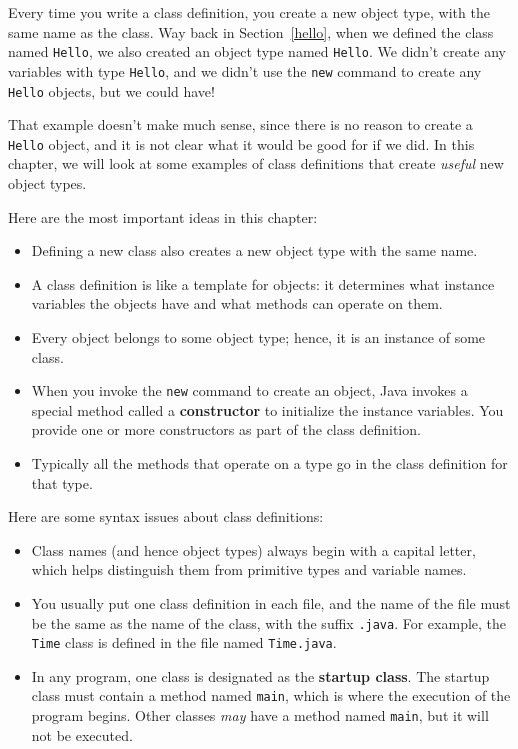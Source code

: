 \documentclass{book}
\begin{document}
Every time you write a class definition, you create a new
object type, with the same name as the class.  Way back in
Section~\ref{hello}, when we defined the class named {\tt Hello},
we also created an object type named {\tt Hello}.  We
didn't create any variables with type {\tt Hello}, and we
didn't use the {\tt new} command to create any {\tt Hello}
objects, but we could have!

That example doesn't make much sense, since there is no
reason to create a {\tt Hello} object, and it is not clear
what it would be good for if we did.  In this chapter, we
will look at some examples of class definitions that create
{\em useful} new object types.

Here are the most important ideas in this chapter:

\begin{itemize}

\item Defining a new class also creates a new object type
with the same name.

\item A class definition is like a template for objects:
it determines what instance variables the objects have and
what methods can operate on them.

\item Every object belongs to some object type; hence, it
is an instance of some class.

\item When you invoke the {\tt new} command to create an object, Java
invokes a special method called a {\bf constructor} to initialize the
instance variables.  You provide one or more constructors as part of
the class definition.

\item Typically all the methods that operate on a type go in the
class definition for that type.

\end{itemize}

Here are some syntax issues about class definitions:

\begin{itemize}

\item Class names (and hence object types) always begin with a capital
letter, which helps distinguish them from primitive types and variable
names.

\item You usually put one class definition in each file, and the name
of the file must be the same as the name of the class, with the suffix
{\tt .java}.  For example, the {\tt Time} class is defined in the file
named {\tt Time.java}.

\item In any program, one class is designated as the {\bf startup
class}.  The startup class must contain a method named {\tt main}, which
is where the execution of the program begins.  Other classes {\em may}
have a method named {\tt main}, but it will not be executed.

\end{itemize}
\end{document}
